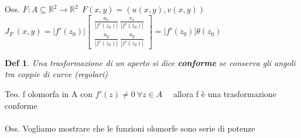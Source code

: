 \documentclass{article}
\theoremstyle{unnumbered}
\newtheorem* {theoremT}{Def}
\theoremstyle{unnumbered1}
\newenvironment{defi}{\begin{gBox}\begin{theoremT}}{\end{theoremT}\end{gBox}}
\begin{document}
%
%
Oss. $F:A\subseteq\mathbb{R}^2\rightarrow\mathbb{R}^2 \ \ F(x,y)=(u(x,y),v(x,y))$ \ \ \ $J_F \ (x,y)=|f'(z_0)|
\begin{bmatrix}
\frac{u_x}{|f'(z_0)|} \ \frac{v_x}{|f'(z_0)|} \\ \frac{u_y}{|f'(z_0)|} \ \frac{u_y}{|f'(z_0)|}
\end{bmatrix}
 =|f'(z_0)| \theta(z_0)$\\
%
%
\begin{defi}
Una trasformazione di un aperto si dice \textbf{conforme} se conserva gli angoli tra coppie di curve (regolari)
\end{defi}
%
Teo. f olomorfa in A con $f'(z)\neq 0 \ \forall z \in A$ \ \ allora f è una trasformazione conforme \\ \\
%
Oss. Vogliamo mostrare che le funzioni olomorfe sono serie di potenze %
\end{document}
